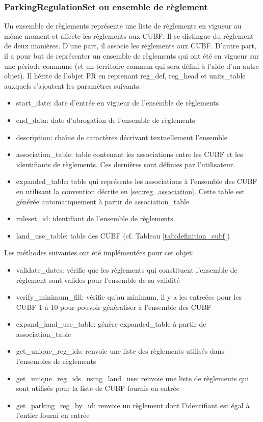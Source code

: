         \subsubsection{ParkingRegulationSet ou ensemble de règlement}
        Un ensemble de règlements représente une liste de règlements en vigueur au même moment et affecte les règlements aux \ac{CUBF}. Il se distingue du règlement de deux manières. D'une part, il associe les règlements aux \ac{CUBF}. D'autre part, il a pour but de représenter un ensemble de règlements qui ont été en vigueur sur une période commune (et un territoire commun qui sera défini à l'aide d'un autre objet). Il hérite de l'objet \ac{PR} en reprenant reg\_def, reg\_head et units\_table auxquels s'ajoutent les paramètres suivants:
        \begin{itemize}
            \item start\_date: date d'entrée en vigueur de l'ensemble de règlements
            \item end\_data: date d'abrogation de l'ensemble de règlements
            \item description: chaîne de caractères décrivant textuellement l'ensemble
            \item association\_table: table contenant les associations entre les \ac{CUBF} et les identifiants de règlements. Ces dernières sont définies par l'utilisateur.
            \item expanded\_table: table qui représente les associations à l'ensemble des \ac{CUBF} en utilisant la convention décrite en \ref{sec:reg_association}. Cette table est générée automatiquement à partir de association\_table
            \item ruleset\_id: identifiant de l'ensemble de règlements
            \item land\_use\_table: table des \ac{CUBF} (cf. Tableau \ref{tab:definition_cubf})
        \end{itemize}
        Les méthodes suivantes ont été implémentées pour cet objet:
        \begin{itemize}
            \item validate\_dates: vérifie que les règlements qui constituent l'ensemble de règlement sont valides pour l'ensemble de sa validité
            \item verify\_minimum\_fill: vérifie qu'au minimum, il y a les entreées pour les \ac{CUBF} 1 à 10 pour pouvoir généraliser à l'ensemble des \ac{CUBF}
            \item expand\_land\_use\_table: génère expanded\_table à partir de association\_table
            \item get\_unique\_reg\_ids: renvoie une liste des règlements utilisés dans l'ensembles de règlements
            \item get\_unique\_reg\_ids\_using\_land\_use: renvoie une liste de règlements qui sont utilisés pour la liste de \ac{CUBF} fournis en entrée
            \item get\_parking\_reg\_by\_id: renvoie un règlement dont l'identifiant est égal à l'entier fourni en entrée
        \end{itemize}
